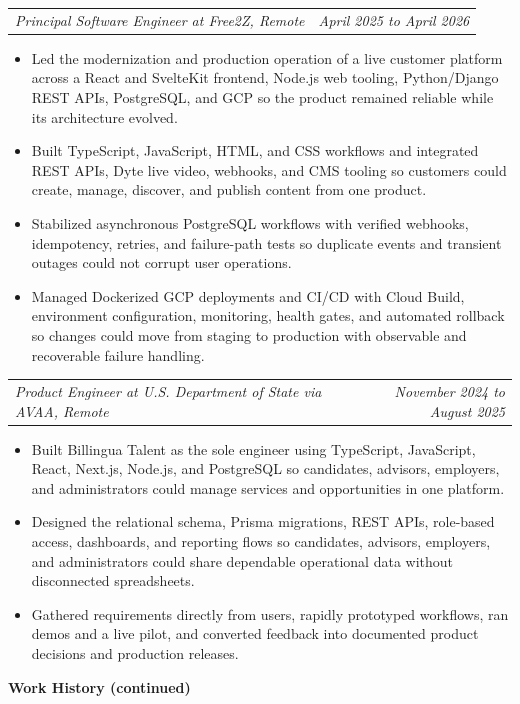\documentclass[10pt,letterpaper]{article}
\makeatletter
\newcommand{\bodyfont}{\fontsize{10.5}{15.75}\selectfont}
\newcommand{\sectiontitle}[1]{%
  \vspace{4pt}
  {\bodyfont\textbf{#1}}\par
  \nopagebreak[4]
  \vspace{2pt}
}
\newcommand{\roleline}[2]{%
  \begin{tabularx}{\textwidth}{@{}Xr@{}}
    \bodyfont\textit{#1} & \bodyfont\textit{#2}
  \end{tabularx}
  \nopagebreak[4]
  \vspace{1pt}
}
\makeatother
\begin{document}
\vspace{3pt}
\roleline{Principal Software Engineer at Free2Z, Remote}{April 2025 to April 2026}
\begin{itemize}
  \item Led the modernization and production operation of a live customer platform across a React and SvelteKit frontend, Node.js web tooling, Python/Django REST APIs, PostgreSQL, and GCP so the product remained reliable while its architecture evolved.
  \item Built TypeScript, JavaScript, HTML, and CSS workflows and integrated REST APIs, Dyte live video, webhooks, and CMS tooling so customers could create, manage, discover, and publish content from one product.
  \item Stabilized asynchronous PostgreSQL workflows with verified webhooks, idempotency, retries, and failure-path tests so duplicate events and transient outages could not corrupt user operations.
  \item Managed Dockerized GCP deployments and CI/CD with Cloud Build, environment configuration, monitoring, health gates, and automated rollback so changes could move from staging to production with observable and recoverable failure handling.
\end{itemize}

\vspace{3pt}
\roleline{Product Engineer at U.S. Department of State via AVAA, Remote}{November 2024 to August 2025}
\begin{itemize}
  \item Built Billingua Talent as the sole engineer using TypeScript, JavaScript, React, Next.js, Node.js, and PostgreSQL so candidates, advisors, employers, and administrators could manage services and opportunities in one platform.
  \item Designed the relational schema, Prisma migrations, REST APIs, role-based access, dashboards, and reporting flows so candidates, advisors, employers, and administrators could share dependable operational data without disconnected spreadsheets.
  \item Gathered requirements directly from users, rapidly prototyped workflows, ran demos and a live pilot, and converted feedback into documented product decisions and production releases.
\end{itemize}

\newpage
\sectiontitle{Work History (continued)}
\end{document}
